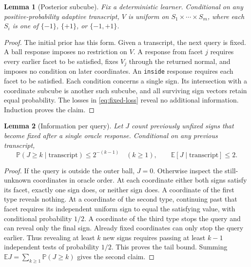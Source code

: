 \documentclass[11pt]{article}
\newcommand{\E}{\mathbb E}
\newcommand{\Prob}{\mathbb P}
\newtheorem{lemma}[lemma]{Lemma}
\theoremstyle{definition}
\begin{document}
\begin{lemma}[Posterior subcube]\label{lem:subcube}
Fix a deterministic learner. Conditional on any positive-probability
adaptive transcript, $V$ is uniform on
$S_1\times\cdots\times S_m$, where each
$S_i$ is one of $\{-1\}$, $\{+1\}$, or $\{-1,+1\}$.
\end{lemma}

\begin{proof}
The initial prior has this form. Given a transcript, the next query is
fixed. A ball response imposes no restriction on $V$. A response from facet
$j$ requires every earlier facet to be satisfied, fixes $V_j$ through the
returned normal, and imposes no condition on later coordinates. An
\texttt{inside} response requires each facet to be satisfied. Each
condition concerns a single sign. Its intersection with a coordinate
subcube is another such subcube, and all surviving sign vectors retain
equal probability. The losses in \eqref{eq:fixed-loss} reveal no additional
information. Induction proves the claim.
\end{proof}

\begin{lemma}[Information per query]\label{lem:information}
Let $J$ count previously unfixed signs that become fixed after a single
oracle response. Conditional on any previous transcript,
\begin{equation}\label{eq:information}
 \Prob(J\ge k\mid\text{transcript})\le2^{-(k-1)}
 \quad(k\ge1),\qquad
 \E[J\mid\text{transcript}]\le2.
\end{equation}
\end{lemma}

\begin{proof}
If the query is outside the outer ball, $J=0$. Otherwise inspect the
still-unknown coordinates in oracle order.
At each coordinate either both signs satisfy its facet, exactly one sign
does, or neither sign does. A coordinate of the first type reveals
nothing. At a coordinate of the second type, continuing past that facet
requires its independent uniform sign to equal the satisfying value, with
conditional probability $1/2$. A coordinate of the third type stops the
query and can reveal only the final sign. Already fixed coordinates can
only stop the query earlier.
Thus revealing at least $k$ new signs requires passing at least $k-1$
independent tests of probability $1/2$. This proves the tail bound.
Summing $\E J=\sum_{k\ge1}\Prob(J\ge k)$ gives the second claim.
\end{proof}
\end{document}
